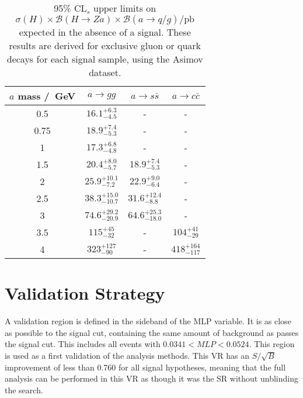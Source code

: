 \documentclass[NOTE, atlasdraft=true, texlive=2017, UKenglish]{\ATLASLATEXPATH atlasdoc}
\begin{document}
\begin{table}[!htbp]{\footnotesize\renewcommand{\arraystretch}{1.2}
  \begin{center}
    \footnotesize
    \begin{tabular}{|c|ccc|}
      \hline
      $a$ mass /~GeV & $a\to gg$ & $a\to s\bar s$ & $a\to c\bar c$ \\
      \hline
      0.5 & $16.1^{+6.3}_{-4.5}$ & - & - \\
      0.75 & $18.9^{+7.4}_{-5.3}$ & - & - \\
      1 & $17.3^{+6.8}_{-4.8}$ & - & - \\
      1.5 & $20.4^{+8.0}_{-5.7}$ & $18.9^{+7.4}_{-5.3}$ & - \\
      2 & $25.9^{+10.1}_{-7.2}$ & $22.9^{+9.0}_{-6.4}$ & - \\
      2.5 & $38.3^{+15.0}_{-10.7}$ & $31.6^{+12.4}_{-8.8}$ & - \\
      3 & $74.6^{+29.2}_{-20.9}$ & $64.6^{+25.3}_{-18.0}$ & - \\
      3.5 & $115^{+45}_{-32}$ & - & $104^{+41}_{-29}$ \\
      4 & $323^{+127}_{-90}$ & - & $418^{+164}_{-117}$ \\
      \hline
    \end{tabular}
    \caption{95\% $\text{CL}_s$ upper limits on $\sigma(H)\times\mathcal{B}(H\to Za)\times\mathcal{B}(a\to q/g)/\text{pb}$ expected in the absence of a signal. These results are derived for exclusive gluon or quark decays for each signal sample, using the Asimov dataset.}
    \label{tab:modelindependentlimitsxsec}
  \end{center}}
\end{table}


\clearpage
\section{Validation Strategy}
\label{sec:validation}

A validation region is defined in the sideband of the MLP variable. It is as close as possible to the signal cut, containing the same amount of background as passes the signal cut. This includes all events with $0.0341<MLP<0.0524$. This region is used as a first validation of the analysis methods. This VR has an $S/\sqrt{B}$ improvement of less than 0.760 for all signal hypotheses, meaning that the full analysis can be performed in this VR as though it was the SR without unblinding the search.
\end{document}
